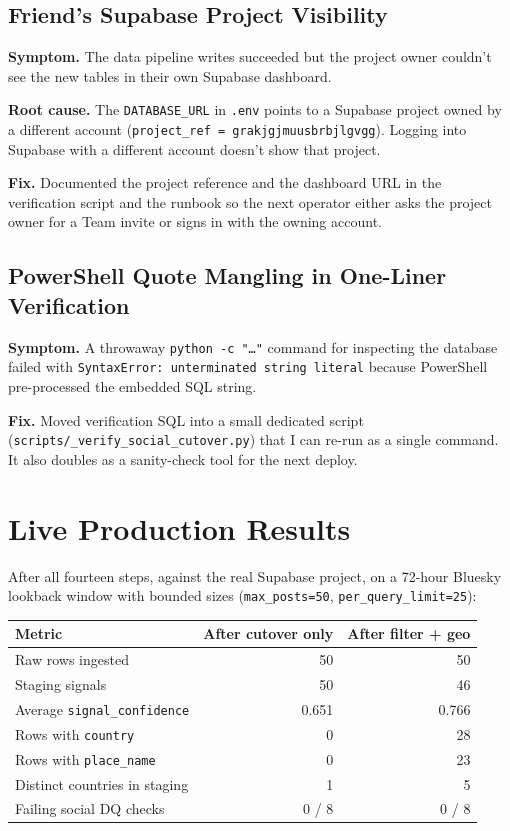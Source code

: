\documentclass[11pt]{article}
\begin{document}
\subsection{Friend's Supabase Project Visibility}

\textbf{Symptom.} The data pipeline writes succeeded but the project
owner couldn't see the new tables in their own Supabase dashboard.

\textbf{Root cause.} The \texttt{DATABASE\_URL} in \texttt{.env}
points to a Supabase project owned by a different account
(\texttt{project\_ref = grakjgjmuusbrbjlgvgg}). Logging into Supabase
with a different account doesn't show that project.

\textbf{Fix.} Documented the project reference and the dashboard URL
in the verification script and the runbook so the next operator either
asks the project owner for a Team invite or signs in with the owning
account.

\subsection{PowerShell Quote Mangling in One-Liner Verification}

\textbf{Symptom.} A throwaway \texttt{python -c "\ldots"} command for
inspecting the database failed with \texttt{SyntaxError: unterminated
string literal} because PowerShell pre-processed the embedded SQL
string.

\textbf{Fix.} Moved verification SQL into a small dedicated script
(\texttt{scripts/\_verify\_social\_cutover.py}) that I can re-run as a
single command. It also doubles as a sanity-check tool for the next
deploy.

\section{Live Production Results}

After all fourteen steps, against the real Supabase project, on a
72-hour Bluesky lookback window with bounded sizes
(\texttt{max\_posts=50}, \texttt{per\_query\_limit=25}):

\begin{center}
\small
\begin{tabular}{lrr}
\toprule
Metric & After cutover only & After filter + geo \\
\midrule
Raw rows ingested                & 50    & 50    \\
Staging signals                  & 50    & 46    \\
Average \texttt{signal\_confidence}     & 0.651 & 0.766 \\
Rows with \texttt{country}              & 0     & 28    \\
Rows with \texttt{place\_name}          & 0     & 23    \\
Distinct countries in staging    & 1     & 5     \\
Failing social DQ checks         & 0 / 8 & 0 / 8 \\
\bottomrule
\end{tabular}
\end{center}
\end{document}
